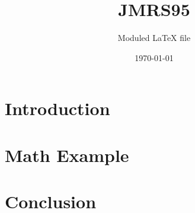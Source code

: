 \documentclass{article}
\title{JMRS95}
\author{Moduled LaTeX file}
\date{\today}
\begin{document}
\maketitle 

\tableofcontents

\section{Introduction}


\section{Math Example}


\section{Conclusion}

\end{document}
